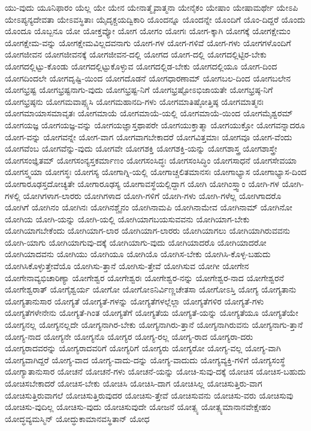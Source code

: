 {ಯು-ವುದು
ಯೂನಿಫಾರಂ
ಯೆಲ್ಲ
ಯೇ
ಯೇನ
ಯೇನಾತ್ಮೈವಾತ್ಮನಾ
ಯೇನೈಕಂ
ಯೇಷಾಂ
ಯೇಷಾಮರ್ಥೇ
ಯೇಽಪಿ
ಯೇಽಪ್ಯನ್ಯದೇವತಾ
ಯೇಽವಸ್ಥಿತಾಃ
ಯೈದೃಕ್ಚಯದ್ವಿಕಾರಿ
ಯೊಂದನ್ನೂ
ಯೊಂದನ್ನೇ
ಯೊಂದಿಗೆ
ಯೊಂ-ದಿದ್ದರೆ
ಯೊಂದು
ಯೊಂದೂ
ಯೊಬ್ಬನೂ
ಯೋ
ಯೋಕ್ತವ್ಯೋ
ಯೋಗ
ಯೋಗಂ
ಯೋಗಃ
ಯೋಗ-ಕ್ಕಾಗಿ
ಯೋಗಕ್ಕೆ
ಯೋಗಕ್ಷೇಮಂ
ಯೋಗಕ್ಷೇಮ-ವನ್ನು
ಯೋಗಕ್ಷೇಮವಿಲ್ಲದವನಾಗು
ಯೋಗ-ಗಳ
ಯೋಗ-ಗಳಿವೆ
ಯೋಗ-ಗಳು
ಯೋಗಗಳೊಂದಿಗೆ
ಯೋಗಜೀವನ
ಯೋಗಜೀವನಕ್ಕೆ
ಯೋಗಜೀವನ-ದಲ್ಲಿ
ಯೋಗದ
ಯೋಗ-ದಲ್ಲಿ
ಯೋಗದಲ್ಲಿಟ್ಟಿರ-ಬೇಕು
ಯೋಗದಲ್ಲಿಟ್ಟು-ಕೊಂಡು
ಯೋಗದಲ್ಲಿಟ್ಟುಕೊಳ್ಳುವ
ಯೋಗದಲ್ಲಿಡ-ಬೇಕು
ಯೋಗದಲ್ಲಿಯೂ
ಯೋಗ-ದಿಂದ
ಯೋಗದಿಂದಲೇ
ಯೋಗದೃಷ್ಟಿ-ಯಿಂದ
ಯೋಗದೊಡನೆ
ಯೋಗಧಾರಣಾಮ್
ಯೋಗಬಲ-ದಿಂದ
ಯೋಗಬಲೇನ
ಯೋಗಭ್ರಷ್ಟ
ಯೋಗಭ್ರಷ್ಟನಾಗು-ವುದು
ಯೋಗಭ್ರಷ್ಟ-ನಿಗೆ
ಯೋಗಭ್ರಷ್ಟೋಽಭಿಜಾಯತೇ
ಯೋಗಭ್ರಷ್ಠ-ನಿಗೆ
ಯೋಗಭ್ರಷ್ಠನು
ಯೋಗಮವಾಪ್ಸ್ಯಸಿ
ಯೋಗಮಹಾನದಿ-ಗಳು
ಯೋಗಮಾತಿಷ್ಠೋತ್ತಿಷ್ಠ
ಯೋಗಮಾತ್ಮನಃ
ಯೋಗಮಾಯಾಸಮಾವೃತಃ
ಯೋಗಮಾಯೆ
ಯೋಗಮಾಯೆ-ಯಲ್ಲಿ
ಯೋಗಮಾಯೆ-ಯಿಂದ
ಯೋಗಮೈಶ್ವರಮ್
ಯೋಗಯಜ್ಞ
ಯೋಗಯಜ್ಞ-ವನ್ನು
ಯೋಗಯಜ್ಞಾಸ್ತಥಾಪರೇ
ಯೋಗಯುಕ್ತಾತ್ಮಾ
ಯೋಗಯುಕ್ತೋ
ಯೋಗವನ್ನಾದರೂ
ಯೋಗ-ವನ್ನು
ಯೋಗವನ್ನೇ
ಯೋಗ-ವಾಗ
ಯೋಗವಾಗಬೇಕಾದರೆ
ಯೋಗವಿತ್ತಮಾಃ
ಯೋಗವೂ
ಯೋಗ-ವೆಂದು
ಯೋಗವೆಂಬ
ಯೋಗವೆನ್ನು-ವುದು
ಯೋಗವೇ
ಯೋಗಶಕ್ತಿ
ಯೋಗಶಕ್ತಿ-ಯನ್ನು
ಯೋಗಶಾಸ್ತ್ರ
ಯೋಗಶಾಸ್ತ್ರೇ
ಯೋಗಸಂಜ್ಞಿತಮ್
ಯೋಗಸಂನ್ಯಸ್ತಕರ್ಮಾಣಂ
ಯೋಗಸಂಸಿದ್ಧಃ
ಯೋಗಸಂಸಿದ್ಧಿಂ
ಯೋಗಸಾಧನೆ
ಯೋಗಸೇವಯಾ
ಯೋಗಸ್ತ್ವಯಾ
ಯೋಗಸ್ಥಃ
ಯೋಗಸ್ಯ
ಯೋಗಾಗ್ನಿ-ಯಲ್ಲಿ
ಯೋಗಾಚ್ಚಲಿತಮಾನಸಃ
ಯೋಗಾಭ್ಯಾಸ
ಯೋಗಾಭ್ಯಾಸ-ದಿಂದ
ಯೋಗಾರೂಢಸ್ತದೋಚ್ಯತೇ
ಯೋಗಾರೂಢಸ್ಯ
ಯೋಗಾವಸ್ಥೆಯಲ್ಲಿದ್ದಾಗ
ಯೋಗಿ
ಯೋಗಿಂಸ್ತ್ವಾಂ
ಯೋಗಿ-ಗಳ
ಯೋಗಿ-ಗಳಲ್ಲಿ
ಯೋಗಿಗಳಾಗ-ಲಾರರು
ಯೋಗಿಗಳಾದ
ಯೋಗಿ-ಗಳಿಗೆ
ಯೋಗಿ-ಗಳು
ಯೋಗಿ-ಗಳೆಲ್ಲ
ಯೋಗಿಗಾದರೊ
ಯೋಗಿಗೆ
ಯೋಗಿನಂ
ಯೋಗಿನಃ
ಯೋಗಿನಶ್ಚೈನಂ
ಯೋಗಿನಾಮಪಿ
ಯೋಗಿನಾಮೇವ
ಯೋಗಿನಾಮ್
ಯೋಗಿನೋ
ಯೋಗಿಯ
ಯೋಗಿ-ಯನ್ನು
ಯೋಗಿ-ಯಲ್ಲಿ
ಯೋಗಿಯಾಗಬಯಸುವವನು
ಯೋಗಿಯಾಗ-ಬೇಕು
ಯೋಗಿಯಾಗಬೇಕೆಂದು
ಯೋಗಿಯಾಗ-ಲಾರ
ಯೋಗಿಯಾಗ-ಲಾರರು
ಯೋಗಿಯಾಗಲು
ಯೋಗಿಯಾಗಿರುವವನು
ಯೋಗಿ-ಯಾಗು
ಯೋಗಿಯಾಗುವು-ದಕ್ಕೆ
ಯೋಗಿಯಾಗು-ವುದು
ಯೋಗಿಯಾದರೊ
ಯೋಗಿಯಾದರೋ
ಯೋಗಿಯಾದವನು
ಯೋಗಿಯು
ಯೋಗಿಯೂ
ಯೋಗಿಯೊ
ಯೋಗಿಸ-ಬೇಕು
ಯೋಗಿಸಿ-ಕೊಳ್ಳ-ಬಹುದು
ಯೋಗಿಸಿಕೊಳ್ಳುತ್ತೇವೆಯೊ
ಯೋಗಿಸು-ತ್ತಾನೆ
ಯೋಗಿಸು-ತ್ತೇವೆ
ಯೋಗಿಸುವ
ಯೋಗೀ
ಯೋಗೇನ
ಯೋಗೇನಾವ್ಯಭಿಚಾರಿಣ್ಯಾ
ಯೋಗೇಶ್ವರ
ಯೋಗೇಶ್ವರಃ
ಯೋಗೇಶ್ವರ-ನನ್ನು
ಯೋಗೇಶ್ವರ-ನಾದ
ಯೋಗೇಶ್ವರನೆ
ಯೋಗೇಶ್ವರಾತ್
ಯೋಗೈಶ್ವರ್ಯ
ಯೋಗೋ
ಯೋಗೋಽನಿರ್ವಿಣ್ಣಚೇತಸಾ
ಯೋಗೋಽಸ್ತಿ
ಯೋಗ್ಯ
ಯೋಗ್ಯತಾನು
ಯೋಗ್ಯತಾನುಸಾರ
ಯೋಗ್ಯತೆ
ಯೋಗ್ಯತೆ-ಗಳನ್ನು
ಯೋಗ್ಯತೆಗಳಲ್ಲೆಲ್ಲಾ
ಯೋಗ್ಯತೆಗಳಿರ
ಯೋಗ್ಯತೆ-ಗಳು
ಯೋಗ್ಯತೆಗಳೇನೇನು
ಯೋಗ್ಯತೆ-ಗಿಂತ
ಯೋಗ್ಯತೆಗೆ
ಯೋಗ್ಯತೆಯ
ಯೋಗ್ಯತೆ-ಯನ್ನು
ಯೋಗ್ಯತೆಯೂ
ಯೋಗ್ಯತೆಯೇ
ಯೋಗ್ಯನಲ್ಲ
ಯೋಗ್ಯನಲ್ಲದೇ
ಯೋಗ್ಯನಾಗಿರ-ಬೇಕು
ಯೋಗ್ಯನಾಗಿರು-ತ್ತಾನೆ
ಯೋಗ್ಯನಾಗಿರುವನು
ಯೋಗ್ಯನಾಗು-ತ್ತಾನೆ
ಯೋಗ್ಯ-ನಾದ
ಯೋಗ್ಯನೇ
ಯೋಗ್ಯನೊ
ಯೋಗ್ಯರ
ಯೋಗ್ಯ-ರಲ್ಲ
ಯೋಗ್ಯ-ರಾದ
ಯೋಗ್ಯರಾ-ದರು
ಯೋಗ್ಯರಾದವರನ್ನು
ಯೋಗ್ಯರಾದವರಿಗೆ
ಯೋಗ್ಯರಿಗೆ
ಯೋಗ್ಯರು
ಯೋಗ್ಯರೋ
ಯೋಗ್ಯ-ವಲ್ಲ
ಯೋಗ್ಯ-ವಾಗಿ
ಯೋಗ್ಯವಾಗಿದ್ದರೆ
ಯೋಗ್ಯ-ವಾದ
ಯೋಗ್ಯ-ವಾದು-ದನ್ನು
ಯೋಗ್ಯ-ವಾದುದು
ಯೋಗ್ಯವ್ಯಕ್ತಿ-ಗಳಿಗೆ
ಯೋಗ್ಯಸಂಸ್ಥೆ
ಯೋಗ್ಯಾತಾನುಸಾರ
ಯೋಚನೆ
ಯೋಚನೆ-ಗಳು
ಯೋಚನೆ-ಯನ್ನು
ಯೋಚಿ-ಸುವು-ದಕ್ಕೆ
ಯೋಚಿಸ
ಯೋಚಿಸ-ಬಹುದು
ಯೋಚಿಸಬೇಕಾದರೆ
ಯೋಚಿಸ-ಬೇಕು
ಯೋಚಿಸಿ
ಯೋಚಿಸಿ-ದಾಗ
ಯೋಚಿಸಿಲ್ಲ
ಯೋಚಿಸುತ್ತಿರು-ವಾಗ
ಯೋಚಿಸುತ್ತಿರುವಾಗಲೆ
ಯೋಚಿಸುತ್ತಿರುವುದರ
ಯೋಚಿಸು-ತ್ತೇವೆ
ಯೋಚಿಸುವನು
ಯೋಚಿಸು-ವರು
ಯೋಚಿಸುವು
ಯೋಚಿಸು-ವುದಿಲ್ಲ
ಯೋಚಿಸು-ವುದು
ಯೋಚಿಸುವುದೇ
ಯೋಜನೆ
ಯೋತ್ಸ್ಯ
ಯೋತ್ಸ್ಯಮಾನಾನವೇಕ್ಷೇಹಂ
ಯೋದ್ಧವ್ಯಮಸ್ಮಿನ್
ಯೋದ್ಧುಕಾಮಾನವಸ್ಥಿತಾನ್
ಯೋಧ
}
